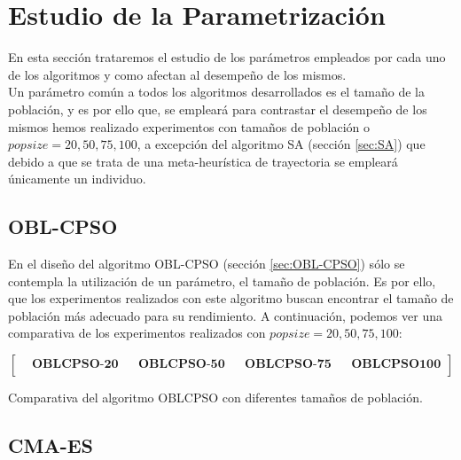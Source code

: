 \newpage

\section{Estudio de la Parametrización}\label{sec:PARAM}

En esta sección trataremos el estudio de los parámetros empleados por cada uno de los algoritmos y como afectan al desempeño de los mismos. \\

Un parámetro común a todos los algoritmos desarrollados es el tamaño de la población, y es por ello que, se empleará para contrastar el desempeño de los mismos hemos realizado experimentos con tamaños de población o $popsize = 20, 50, 75, 100$, a excepción del algoritmo SA (sección \ref{sec:SA}) que debido a que se trata de una meta-heurística de trayectoria se empleará únicamente un individuo.

\subsection{OBL-CPSO}\label{sec:paramOBL_CPSO}

En el diseño del algoritmo OBL-CPSO (sección \ref{sec:OBL-CPSO}) sólo se contempla la utilización de un parámetro, el tamaño de población. Es por ello, que los experimentos realizados con este algoritmo buscan encontrar el tamaño de población más adecuado para su rendimiento. A continuación, podemos ver una comparativa de los experimentos realizados con $popsize = 20, 50, 75, 100$: \\

\begin{table}[!ht]
  \centering
\[
\begin{bmatrix}
   & \textbf{OBLCPSO-20} &  & \textbf{OBLCPSO-50} & & \textbf{OBLCPSO-75} & & \textbf{OBLCPSO100} \\
\end{bmatrix}
\]
 \captionsetup{justification=centering}
    \caption{Comparativa del algoritmo OBLCPSO con diferentes tamaños de población.}    
\end{table}

\subsection{CMA-ES}\label{sec:paramCMA_ES}

